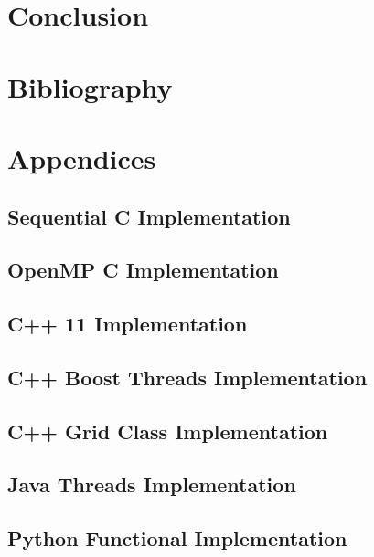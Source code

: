 \documentclass[11pt]{article} %
\begin{document}

\section{Conclusion}
\section{Bibliography}
\nocite{*}


\appendix
\pagebreak
\section{Appendices}
\subsection{Sequential C Implementation}

\pagebreak
\subsection{OpenMP C Implementation}

\pagebreak
\subsection{C++ 11 Implementation}

\pagebreak
\subsection{C++ Boost Threads Implementation}

\pagebreak
\subsection{C++ Grid Class Implementation}

\pagebreak
\subsection{Java Threads Implementation}

\pagebreak
\subsection{Python Functional Implementation}

\pagebreak
\end{document}
